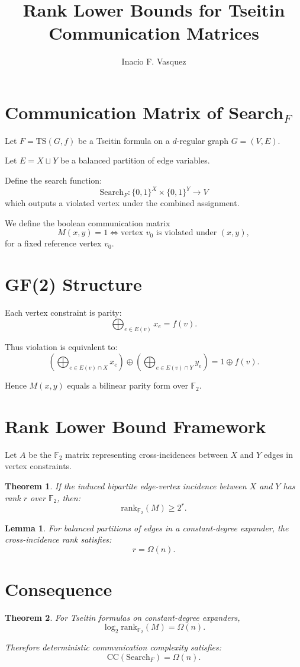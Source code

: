 \documentclass[11pt]{article}
\title{Rank Lower Bounds for Tseitin Communication Matrices}
\author{Inacio F. Vasquez}
\date{}
\newtheorem{theorem}{Theorem}
\newtheorem{lemma}{Lemma}
\begin{document}
\maketitle

\section{Communication Matrix of Search$_F$}

Let $F=\mathrm{TS}(G,f)$ be a Tseitin formula on a $d$-regular graph $G=(V,E)$.

Let $E=X\sqcup Y$ be a balanced partition of edge variables.

Define the search function:
\[
\mathrm{Search}_F : \{0,1\}^X \times \{0,1\}^Y \to V
\]
which outputs a violated vertex under the combined assignment.

We define the boolean communication matrix
\[
M(x,y) = 1 \iff \text{vertex } v_0 \text{ is violated under } (x,y),
\]
for a fixed reference vertex $v_0$.

\section{GF(2) Structure}

Each vertex constraint is parity:
\[
\bigoplus_{e\in E(v)} x_e = f(v).
\]

Thus violation is equivalent to:
\[
\left(\bigoplus_{e\in E(v)\cap X} x_e\right)
\oplus
\left(\bigoplus_{e\in E(v)\cap Y} y_e\right)
= 1 \oplus f(v).
\]

Hence $M(x,y)$ equals a bilinear parity form over $\mathbb{F}_2$.

\section{Rank Lower Bound Framework}

Let $A$ be the $\mathbb{F}_2$ matrix representing cross-incidences between $X$ and $Y$ edges in vertex constraints.

\begin{theorem}
If the induced bipartite edge-vertex incidence between $X$ and $Y$ has rank $r$ over $\mathbb{F}_2$, then:
\[
\mathrm{rank}_{\mathbb{F}_2}(M) \ge 2^{r}.
\]
\end{theorem}

\begin{lemma}
For balanced partitions of edges in a constant-degree expander, the cross-incidence rank satisfies:
\[
r = \Omega(n).
\]
\end{lemma}

\section{Consequence}

\begin{theorem}
For Tseitin formulas on constant-degree expanders,
\[
\log_2 \mathrm{rank}_{\mathbb{F}_2}(M) = \Omega(n).
\]

Therefore deterministic communication complexity satisfies:
\[
\mathrm{CC}(\mathrm{Search}_F) = \Omega(n).
\]
\end{theorem}
\end{document}
